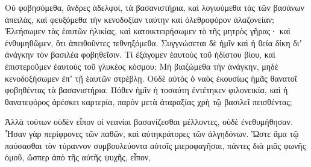 {Οὐ φοβησόμεθα, ἄνδρες ἀδελφοί, τὰ βασανιστήρια, καὶ λογιούμεθα τὰς τῶν βασάνων ἀπειλὰς, καὶ φευξόμεθα τὴν κενοδοξίαν ταύτην καὶ ὀλεθροφόρον ἀλαζονείαν;
Ἐλεήσωμεν τὰς ἑαυτῶν ἡλικίας, καὶ κατοικτειρήσωμεν τὸ τῆς μητρὸς γῆρας·
καὶ ἐνθυμηθῶμεν, ὅτι ἀπειθοῦντες τεθνηξόμεθα.
Συγγνώσεται δὲ ἡμῖν καὶ ἡ θεία δίκη διʼ ἀνάγκην τὸν βασιλέα φοβηθεῖσιν.
Τί ἐξάγομεν ἑαυτοὺς τοῦ ἡδίστου βίου, καὶ ἐπιστεροῦμεν ἐαυτοὺς τοῦ γλυκέος κόσμου;
Μὴ βιαζώμεθα τὴν ἀνάγκην, μηδὲ κενοδοξήσωμεν ἐπʼ τῇ ἑαυτῶν στρέβλῃ.
Οὐδὲ αὐτὸς ὁ ναὸς ἑκουσίως ἡμᾶς θανατοῖ φοβηθέντας τὰ βασανιστήρια.
Πόθεν ἡμῖν ἡ τοσαύτη ἐντέτηκεν φιλονεικία, καὶ ἡ θανατεφόρος ἀρέσκει καρτερία, παρὸν μετὰ ἀταραξίας χρὴ τῷ βασιλεῖ πεισθέντας;
\par }{\PP {}Ἀλλὰ τούτων οὐδὲν εἶπον οἱ νεανίαι βασανίζεσθαι μέλλοντες, οὐδὲ ἐνεθυμήθησαν.
Ἦσαν γὰρ περίφρονες τῶν παθῶν, καὶ αὐτηκράτορες τῶν ἀλγηδόνων. Ὥστε ἅμα τῷ παύσασθαι τὸν τύραννον συμβουλεύοντα αὐτοῖς μιεροφαγῆσαι, πάντες διὰ μιᾶς φωνῆς ὁμοῦ, ὥσπερ ἀπὸ τῆς αὐτῆς ψυχῆς, εἶπον,

}
